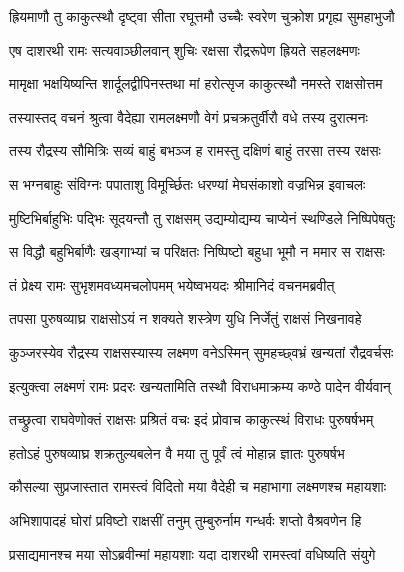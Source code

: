 
\twolineshloka
{ह्रियमाणौ तु काकुत्स्थौ दृष्ट्वा सीता रघूत्तमौ}
{उच्चैः स्वरेण चुक्रोश प्रगृह्य सुमहाभुजौ} %

\twolineshloka
{एष दाशरथी रामः सत्यवाञ्छीलवान् शुचिः}
{रक्षसा रौद्ररूपेण ह्रियते सहलक्ष्मणः} %

\twolineshloka
{मामृक्षा भक्षयिष्यन्ति शार्दूलद्वीपिनस्तथा}
{मां हरोत्सृज काकुत्स्थौ नमस्ते राक्षसोत्तम} %

\twolineshloka
{तस्यास्तद् वचनं श्रुत्वा वैदेह्या रामलक्ष्मणौ}
{वेगं प्रचक्रतुर्वीरौ वधे तस्य दुरात्मनः} %

\twolineshloka
{तस्य रौद्रस्य सौमित्रिः सव्यं बाहुं बभञ्ज ह}
{रामस्तु दक्षिणं बाहुं तरसा तस्य रक्षसः} %

\twolineshloka
{स भग्नबाहुः संविग्नः पपाताशु विमूर्च्छितः}
{धरण्यां मेघसंकाशो वज्रभिन्न इवाचलः} %

\twolineshloka
{मुष्टिभिर्बाहुभिः पद्भिः सूदयन्तौ तु राक्षसम्}
{उद्यम्योद्यम्य चाप्येनं स्थण्डिले निष्पिपेषतुः} %

\twolineshloka
{स विद्धौ बहुभिर्बाणैः खड्गाभ्यां च परिक्षतः}
{निष्पिष्टो बहुधा भूमौ न ममार स राक्षसः} %

\twolineshloka
{तं प्रेक्ष्य रामः सुभृशमवध्यमचलोपमम्}
{भयेष्वभयदः श्रीमानिदं वचनमब्रवीत्} %

\twolineshloka
{तपसा पुरुषव्याघ्र राक्षसोऽयं न शक्यते}
{शस्त्रेण युधि निर्जेतुं राक्षसं निखनावहे} %

\twolineshloka
{कुञ्जरस्येव रौद्रस्य राक्षसस्यास्य लक्ष्मण}
{वनेऽस्मिन् सुमहच्छ्वभ्रं खन्यतां रौद्रवर्चसः} %

\twolineshloka
{इत्युक्त्वा लक्ष्मणं रामः प्रदरः खन्यतामिति}
{तस्थौ विराधमाक्रम्य कण्ठे पादेन वीर्यवान्} %

\twolineshloka
{तच्छ्रुत्वा राघवेणोक्तं राक्षसः प्रश्रितं वचः}
{इदं प्रोवाच काकुत्स्थं विराधः पुरुषर्षभम्} %

\twolineshloka
{हतोऽहं पुरुषव्याघ्र शक्रतुल्यबलेन वै}
{मया तु पूर्वं त्वं मोहान्न ज्ञातः पुरुषर्षभ} %

\twolineshloka
{कौसल्या सुप्रजास्तात रामस्त्वं विदितो मया}
{वैदेही च महाभागा लक्ष्मणश्च महायशाः} %

\twolineshloka
{अभिशापादहं घोरां प्रविष्टो राक्षसीं तनुम्}
{तुम्बुरुर्नाम गन्धर्वः शप्तो वैश्रवणेन हि} %

\twolineshloka
{प्रसाद्यमानश्च मया सोऽब्रवीन्मां महायशाः}
{यदा दाशरथी रामस्त्वां वधिष्यति संयुगे} %

